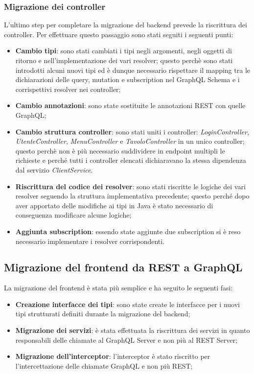 \subsubsection*{Migrazione dei controller}
L'ultimo step per completare la migrazione del backend prevede la riscrittura dei controller. Per effettuare questo passaggio sono stati seguiti i seguenti punti:
\begin{itemize}
  \item \textbf{Cambio tipi}: sono stati cambiati i tipi negli argomenti, negli oggetti di ritorno e nell'implementazione dei vari resolver; questo perchè sono stati introdotti alcuni nuovi tipi ed è dunque necessario rispettare il mapping tra le dichiarazioni delle query, mutation e subscription nel GraphQL Schema e i corrispettivi resolver nei controller;
  \item \textbf{Cambio annotazioni}: sono state sostituite le annotazioni REST con quelle GraphQL;
  \item \textbf{Cambio struttura controller}: sono stati uniti i controller: \textit{LoginController}, \textit{UtenteController}, \textit{MenuController} e \textit{TavoloController} in un unico controller; questo perchè non è più necessario suddividere in endpoint multipli le richieste e perché tutti i controller elencati dichiaravano la stessa dipendenza dal servizio \textit{ClientService}.
  \item \textbf{Riscrittura del codice dei resolver}: sono stati riscritte le logiche dei vari resolver seguendo la struttura implementativa precedente; questo perché dopo aver apportato delle modifiche ai tipi in Java è stato necessario di conseguenza modificare alcune logiche;
  \item \textbf{Aggiunta subscription}: essendo state aggiunte due subscription si è reso necessario implementare i resolver corrispondenti.
\end{itemize}
\subsection{Migrazione del frontend da REST a GraphQL}
La migrazione del frontend è stata più semplice e ha seguito le seguenti fasi:
\begin{itemize}
  \item \textbf{Creazione interfacce dei tipi}: sono state create le interfacce per i nuovi tipi strutturati definiti durante la migrazione del backend;
  \item \textbf{Migrazione dei servizi}: è stata effettuata la riscrittura dei servizi in quanto responsabili delle chiamate al GraphQL Server e non più al REST Server;
  \item \textbf{Migrazione dell'interceptor}: l'interceptor è stato riscritto per l'intercettazione delle chiamate GraphQL e non più REST;
\end{itemize}
